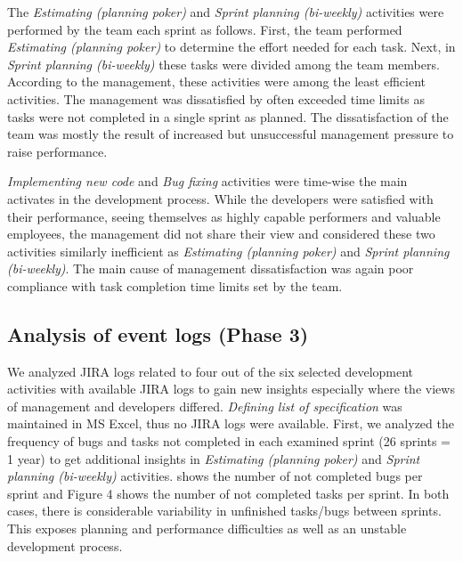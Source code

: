 The \emph{Estimating (planning poker)} and \emph{Sprint planning (bi-weekly)} activities were performed by the team each sprint as follows. First, the team performed \emph{Estimating (planning poker)} to determine the effort needed for each task. Next, in \emph{Sprint planning (bi-weekly)} these tasks were divided among the team members. According to the management, these activities were among the least efficient activities. The management was dissatisfied by often exceeded time limits as tasks were not completed in a single sprint as planned. The dissatisfaction of the team was mostly the result of increased but unsuccessful management pressure to raise performance.

\emph{Implementing new code} and \emph{Bug fixing} activities were time-wise the main activates in the development process. While the developers were satisfied with their performance, seeing themselves as highly capable performers and valuable employees, the management did not share their view and considered these two activities similarly inefficient as \emph{Estimating (planning poker)} and \emph{Sprint planning (bi-weekly)}. The main cause of management dissatisfaction was again poor compliance with task completion time limits set by the team.

\subsection{Analysis of event logs (Phase 3)}
\label{subsec:phase3}

We analyzed JIRA logs related to four out of the six selected development activities with available JIRA logs to gain new insights especially where the views of management and developers differed. \emph{Defining list of specification} was maintained in MS Excel, thus no JIRA logs were available. First, we analyzed the frequency of bugs and tasks not completed in each examined sprint (26 sprints = 1 year) to get additional insights in \emph{Estimating (planning poker)} and \emph{Sprint planning (bi-weekly)} activities.  shows the number of not completed bugs per sprint and Figure 4 shows the number of not completed tasks per sprint. In both cases, there is considerable variability in unfinished tasks/bugs between sprints. This exposes planning and performance difficulties as well as an unstable development process. 



